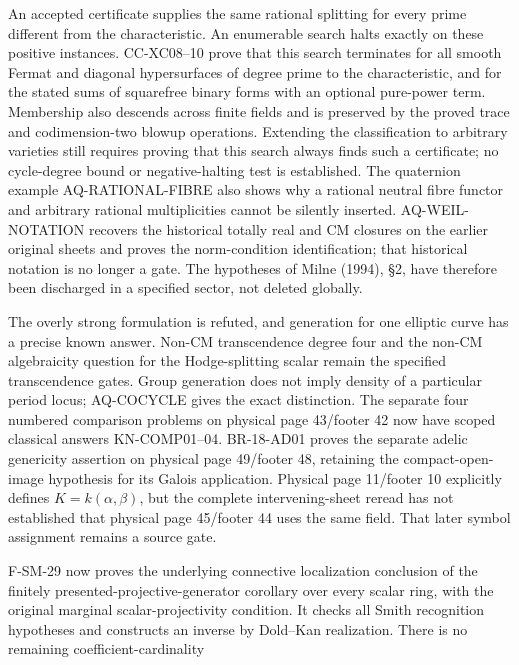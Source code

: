 \begin{description}[style=nextline,leftmargin=0pt]
An accepted certificate supplies the same rational splitting for
every prime different from the characteristic. An enumerable search
halts exactly on these positive instances. CC-XC08--10 prove that this
search terminates for all smooth Fermat and diagonal hypersurfaces of
degree prime to the characteristic, and for the stated sums of
squarefree binary forms with an optional pure-power term. Membership
also descends across finite fields and is preserved by the proved
trace and codimension-two blowup operations. Extending the classification
to arbitrary varieties still requires proving that this search always
finds such a certificate; no cycle-degree bound or negative-halting
test is established. The
quaternion example AQ-RATIONAL-FIBRE also shows why a rational neutral
fibre functor and arbitrary rational multiplicities cannot be silently
inserted. AQ-WEIL-NOTATION recovers the historical totally real and CM
closures on the earlier original sheets and proves the norm-condition
identification; that historical notation is no longer a gate.
The hypotheses of Milne (1994), \S2, have therefore been
discharged in a specified sector, not deleted globally.
\item[Cote 18, scans 11--13 and 59: period density.]
The overly strong formulation is refuted, and generation for one
elliptic curve has a precise known answer. Non-CM transcendence degree
four and the non-CM algebraicity question for the Hodge-splitting
scalar remain the specified transcendence gates. Group generation
does not imply density of a particular period locus; AQ-COCYCLE
gives the exact distinction. The separate four numbered comparison
problems on physical page 43/footer 42 now have scoped classical
answers KN-COMP01--04. BR-18-AD01 proves the separate adelic
genericity assertion on physical page 49/footer 48, retaining the
compact-open-image hypothesis for its Galois application.
Physical page 11/footer 10 explicitly defines $K=k(\alpha,\beta)$,
but the complete intervening-sheet reread has not established that
physical page 45/footer 44 uses the same field. That later symbol
assignment remains a source gate.
\item[Cote 134-8, footers 47--54: abstract scope and ordinary right adjoint.]
F-SM-29 now proves the underlying connective localization conclusion
of the finitely presented-projective-generator corollary over every
scalar ring, with the original marginal scalar-projectivity condition.
It checks all Smith recognition hypotheses and constructs an inverse
by Dold--Kan realization. There is no remaining coefficient-cardinality

\end{description}
